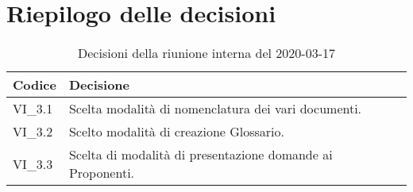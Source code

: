 \section{Riepilogo delle decisioni}
\begin{longtable}{ 
	 >{\centering}p{} >{}p{} }
	
	\caption{Decisioni della riunione interna del 2020-03-17}\\	
	
	\textbf{\color{white}Codice} & 
	\textbf{\color{white}Decisione} 
	\tabularnewline  
	\endhead
	
	VI\_3.1 & Scelta modalità di nomenclatura dei vari documenti. \\
	VI\_3.2 & Scelto modalità di creazione Glossario. \\
	VI\_3.3 & Scelta di modalità di presentazione domande ai Proponenti. \\
	
\end{longtable}